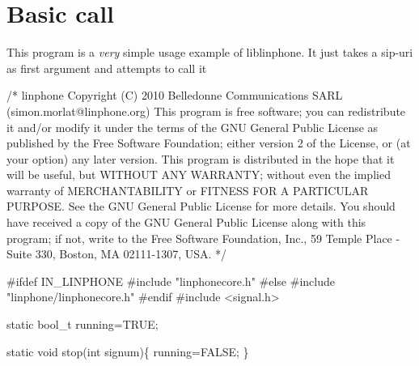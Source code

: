\section{Basic call}
\label{group__basic__call__tutorials}
This program is a {\itshape very} simple usage example of liblinphone. It just takes a sip-\/uri as first argument and attempts to call it


\begin{DoxyCodeInclude}

\textcolor{comment}{/*}
\textcolor{comment}{linphone}
\textcolor{comment}{Copyright (C) 2010  Belledonne Communications SARL }
\textcolor{comment}{ (simon.morlat@linphone.org)}
\textcolor{comment}{}
\textcolor{comment}{This program is free software; you can redistribute it and/or}
\textcolor{comment}{modify it under the terms of the GNU General Public License}
\textcolor{comment}{as published by the Free Software Foundation; either version 2}
\textcolor{comment}{of the License, or (at your option) any later version.}
\textcolor{comment}{}
\textcolor{comment}{This program is distributed in the hope that it will be useful,}
\textcolor{comment}{but WITHOUT ANY WARRANTY; without even the implied warranty of}
\textcolor{comment}{MERCHANTABILITY or FITNESS FOR A PARTICULAR PURPOSE.  See the}
\textcolor{comment}{GNU General Public License for more details.}
\textcolor{comment}{}
\textcolor{comment}{You should have received a copy of the GNU General Public License}
\textcolor{comment}{along with this program; if not, write to the Free Software}
\textcolor{comment}{Foundation, Inc., 59 Temple Place - Suite 330, Boston, MA  02111-1307, USA.}
\textcolor{comment}{*/}

\textcolor{preprocessor}{#ifdef IN\_LINPHONE}
\textcolor{preprocessor}{}\textcolor{preprocessor}{#include "linphonecore.h"}
\textcolor{preprocessor}{#else}
\textcolor{preprocessor}{}\textcolor{preprocessor}{#include "linphone/linphonecore.h"}
\textcolor{preprocessor}{#endif}
\textcolor{preprocessor}{}
\textcolor{preprocessor}{#include <signal.h>}

\textcolor{keyword}{static} bool\_t running=TRUE;

\textcolor{keyword}{static} \textcolor{keywordtype}{void} stop(\textcolor{keywordtype}{int} signum)\{
        running=FALSE;
\}


\end{DoxyCodeInclude}
